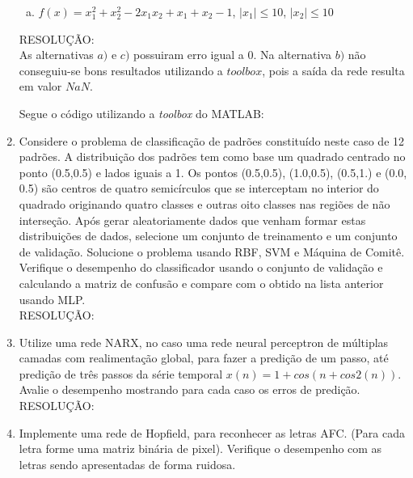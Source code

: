 \documentclass[a4paper,oneside,12pt]{article}
\begin{document}
\begin{enumerate}[1.]
\begin{enumerate}[a)]
\item $f(x) = x_{1}^{2} + x_{2}^{2} - 2 x_{1} x_{2} + x_{1} + x_{2} - 1$, $|x_{1}| \leq 10$, $|x_{2}| \leq 10$
\end{enumerate}

RESOLU\c{C}\~AO: \\

As alternativas $a)$ e $c)$ possuiram erro igual a $0$. Na alternativa $b)$ n\~ao conseguiu-se bons resultados utilizando a $toolbox$, pois a sa\'ida da rede resulta em valor $NaN$.

Segue o c\'odigo utilizando a \emph{toolbox} do MATLAB:



\item Considere o problema de classifica\c{c}\~ao de padr\~oes constitu\'ido neste caso de 12 padr\~oes. A distribui\c{c}\~ao dos padr\~oes tem como base um quadrado centrado no ponto (0.5,0.5) e lados iguais a 1. Os pontos (0.5,0.5), (1.0,0.5), (0.5,1.) e (0.0, 0.5) s\~ao centros de quatro semic\'irculos que se interceptam no interior do quadrado originando quatro classes e outras oito classes nas regi\~oes de n\~ao interse\c{c}\~ao. Ap\'os gerar aleatoriamente dados que venham formar estas distribui\c{c}\~oes de dados, selecione um conjunto de treinamento e um conjunto de valida\c{c}\~ao. Solucione o problema usando RBF, SVM e M\'aquina de Comit\^e. Verifique o desempenho do classificador usando o conjunto de valida\c{c}\~ao e calculando a matriz de confus\~ao e compare com o obtido na lista anterior usando MLP. \\

RESOLU\c{C}\~AO: \\

\item Utilize uma rede NARX, no caso uma rede neural perceptron de m\'ultiplas camadas com realimenta\c{c}\~ao global, para fazer a predi\c{c}\~ao de um passo, at\'e predi\c{c}\~ao de tr\^es passos da s\'erie temporal $x(n) = 1 + cos(n + cos 2 (n))$. Avalie o desempenho mostrando para cada caso os erros de predi\c{c}\~ao. \\

RESOLU\c{C}\~AO: \\

\item Implemente uma rede de Hopfield, para reconhecer as letras AFC. (Para cada letra forme uma matriz bin\'aria de pixel). Verifique o desempenho com as letras sendo apresentadas de forma ruidosa. \\


\end{enumerate}
\end{document}
